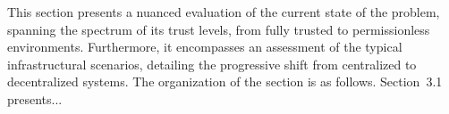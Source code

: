 This section presents a nuanced evaluation of the current state of the \pol{} problem, spanning the spectrum of its trust levels, from fully trusted to permissionless environments. Furthermore, it encompasses an assessment of the typical infrastructural scenarios, detailing the progressive shift from centralized to decentralized systems. The organization of the section is as follows. Section~3.1 presents...